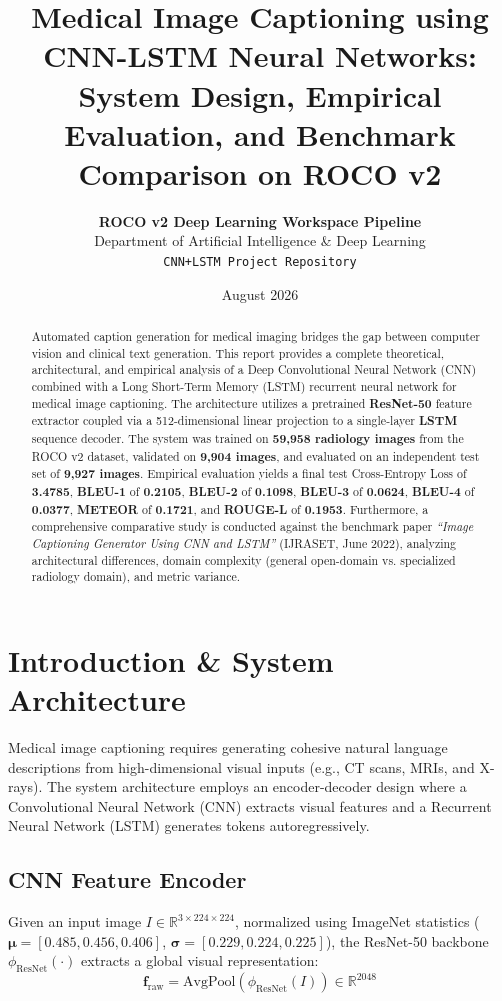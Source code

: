 \documentclass[11pt,a4paper]{article}
\title{\textbf{Medical Image Captioning using CNN-LSTM Neural Networks: System Design, Empirical Evaluation, and Benchmark Comparison on ROCO v2}}
\author{\textbf{ROCO v2 Deep Learning Workspace Pipeline} \\
Department of Artificial Intelligence \& Deep Learning \\
\texttt{CNN+LSTM Project Repository}}
\date{August 2026}
\begin{document}
\maketitle

\begin{abstract}
Automated caption generation for medical imaging bridges the gap between computer vision and clinical text generation. This report provides a complete theoretical, architectural, and empirical analysis of a Deep Convolutional Neural Network (CNN) combined with a Long Short-Term Memory (LSTM) recurrent neural network for medical image captioning. The architecture utilizes a pretrained \textbf{ResNet-50} feature extractor coupled via a 512-dimensional linear projection to a single-layer \textbf{LSTM} sequence decoder. The system was trained on \textbf{59,958 radiology images} from the ROCO v2 dataset, validated on \textbf{9,904 images}, and evaluated on an independent test set of \textbf{9,927 images}. Empirical evaluation yields a final test Cross-Entropy Loss of \textbf{3.4785}, \textbf{BLEU-1} of \textbf{0.2105}, \textbf{BLEU-2} of \textbf{0.1098}, \textbf{BLEU-3} of \textbf{0.0624}, \textbf{BLEU-4} of \textbf{0.0377}, \textbf{METEOR} of \textbf{0.1721}, and \textbf{ROUGE-L} of \textbf{0.1953}. Furthermore, a comprehensive comparative study is conducted against the benchmark paper \textit{``Image Captioning Generator Using CNN and LSTM''} (IJRASET, June 2022), analyzing architectural differences, domain complexity (general open-domain vs. specialized radiology domain), and metric variance.
\end{abstract}

\section{Introduction \& System Architecture}

Medical image captioning requires generating cohesive natural language descriptions from high-dimensional visual inputs (e.g., CT scans, MRIs, and X-rays). The system architecture employs an encoder-decoder design where a Convolutional Neural Network (CNN) extracts visual features and a Recurrent Neural Network (LSTM) generates tokens autoregressively.

\subsection{CNN Feature Encoder}
Given an input image $I \in \mathbb{R}^{3 \times 224 \times 224}$, normalized using ImageNet statistics ($\boldsymbol{\mu} = [0.485, 0.456, 0.406]$, $\boldsymbol{\sigma} = [0.229, 0.224, 0.225]$), the ResNet-50 backbone $\phi_{\text{ResNet}}(\cdot)$ extracts a global visual representation:
\begin{equation}
\mathbf{f}_{\text{raw}} = \text{AvgPool}(\phi_{\text{ResNet}}(I)) \in \mathbb{R}^{2048}
\end{equation}
\end{document}
